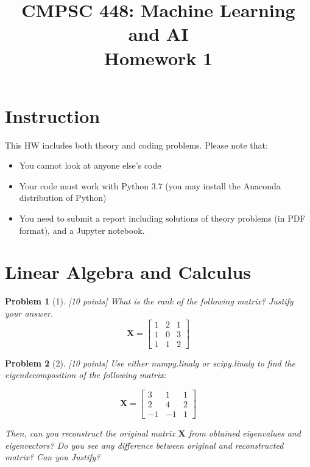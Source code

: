 \documentclass[11pt]{article}
\title{CMPSC 448: Machine Learning and AI \\ Homework 1}
\author{}
\date{}
\theoremstyle{quest}
\newtheorem*{problem}{Problem}
\begin{document}
\maketitle


\section*{Instruction}
This HW includes both theory and coding problems. Please note that:
\begin{itemize}
    \item You cannot look at anyone else's code
    \item Your code must work with Python 3.7 (you may install the Anaconda distribution of Python)
    \item You need to submit a report including solutions of theory problems (in PDF format), and a \textsf{Jupyter} notebook.
\end{itemize}

\section*{Linear Algebra and Calculus}
\begin{problem}[1] [10 points]
What is the rank of the following matrix? Justify your answer.
\begin{equation*}
    \bm{X} = \begin{bmatrix}
    1 & 2 & 1\\
    1 & 0 & 3\\
    1 & 1 & 2
    \end{bmatrix} 
\end{equation*}
\end{problem}

\begin{problem}[2]
[10 points] Use either \textsf{numpy.linalg} or \textsf{scipy.linalg} to find the eigendecomposition of the following matrix:

\begin{equation*}
\bm{X} = \begin{bmatrix}
3 & 1 & 1\\
2 & 4 & 2\\
-1 & -1 & 1
\end{bmatrix}   
\end{equation*}

Then, can you reconstruct the original matrix $\bm{X}$ from obtained eigenvalues and eigenvectors? Do you see any difference between original and reconstructed matrix? Can you Justify?
\end{problem}
\end{document}
